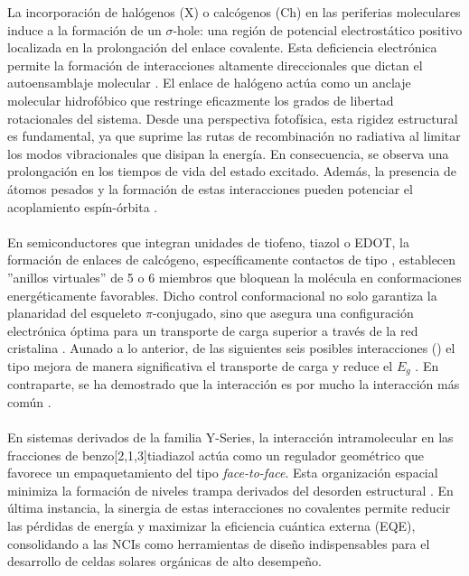 La incorporación de halógenos (X) o calcógenos (Ch) en las periferias moleculares induce a la formación de un $\sigma$-hole: una región de potencial electrostático positivo localizada en la prolongación del enlace covalente. Esta deficiencia electrónica permite la formación de interacciones altamente direccionales que dictan el autoensamblaje molecular \cite{haque2023non}. El enlace de halógeno actúa como un anclaje molecular hidrofóbico que restringe eficazmente los grados de libertad rotacionales del sistema. Desde una perspectiva fotofísica, esta rigidez estructural es fundamental, ya que suprime las rutas de recombinación no radiativa al limitar los modos vibracionales que disipan la energía. En consecuencia, se observa una prolongación en los tiempos de vida del estado excitado. Además, la presencia de átomos pesados y la formación de estas interacciones pueden potenciar el acoplamiento espín-órbita \cite{yang2020boosting}. \\ \\
En semiconductores que integran unidades de tiofeno, tiazol o EDOT, la formación de enlaces de calcógeno, específicamente contactos de tipo , establecen ''anillos virtuales'' de 5 o 6 miembros que bloquean la molécula en conformaciones energéticamente favorables. Dicho control conformacional no solo garantiza la planaridad del esqueleto $\pi$-conjugado, sino que asegura una configuración electrónica óptima para un transporte de carga superior a través de la red cristalina \cite{haque2023non}. Aunado a lo anterior, de las siguientes seis posibles interacciones () el tipo   mejora de manera significativa el transporte de carga y reduce el $E_g$ \cite{liu2021beyond}. En contraparte, se ha demostrado que la interacción  es por mucho la interacción más común \cite{haque2023non}. \\ \\
En sistemas derivados de la familia Y-Series, la interacción intramolecular  en las fracciones de benzo[2,1,3]tiadiazol actúa como un regulador geométrico que favorece un empaquetamiento del tipo \textit{face-to-face}. Esta organización espacial minimiza la formación de niveles trampa derivados del desorden estructural \cite{lin2020non}. En última instancia, la sinergia de estas interacciones no covalentes permite reducir las pérdidas de energía y maximizar la eficiencia cuántica externa (EQE), consolidando a las NCIs como herramientas de diseño indispensables para el desarrollo de celdas solares orgánicas de alto desempeño.
